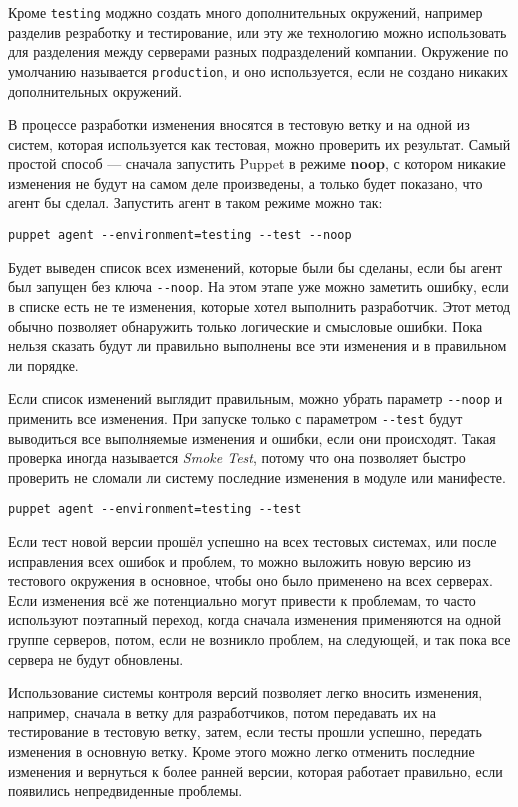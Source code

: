 Кроме \texttt{testing} моджно создать много дополнительных окружений, например разделив резработку и тестирование, или эту же технологию можно использовать для разделения между серверами разных подразделений компании. Окружение по умолчанию называется \texttt{production}, и оно используется, если не создано никаких дополнительных окружений.

В процессе разработки изменения вносятся в тестовую ветку и на одной из систем, которая используется как тестовая, можно проверить их результат. Самый простой способ --- сначала запустить Puppet в режиме \textbf{noop}, с котором никакие изменения не будут на самом деле произведены, а только будет показано, что агент бы сделал. Запустить агент в таком режиме можно так:

\begin{verbatim}
puppet agent --environment=testing --test --noop
\end{verbatim}

Будет выведен список всех изменений, которые были бы сделаны, если бы агент был запущен без ключа \texttt{-{}-noop}. На этом этапе уже можно заметить ошибку, если в списке есть не те изменения, которые хотел выполнить разработчик. Этот метод обычно позволяет обнаружить только логические и смысловые ошибки. Пока нельзя сказать будут ли правильно выполнены все эти изменения и в правильном ли порядке.

Если список изменений выглядит правильным, можно убрать параметр \texttt{-{}-noop} и применить все изменения. При запуске только с параметром \texttt{-{}-test} будут выводиться все выполняемые изменения и ошибки, если они происходят. Такая проверка иногда называется \textit{Smoke Test}, потому что она позволяет быстро проверить не сломали ли систему последние изменения в модуле или манифесте.

\begin{verbatim}
puppet agent --environment=testing --test
\end{verbatim}

Если тест новой версии прошёл успешно на всех тестовых системах, или после исправления всех ошибок и проблем, то можно выложить новую версию из тестового окружения в основное, чтобы оно было применено на всех серверах. Если изменения всё же потенциально могут привести к проблемам, то часто используют поэтапный переход, когда сначала изменения применяются на одной группе серверов, потом, если не возникло проблем, на следующей, и так пока все сервера не будут обновлены.

Использование системы контроля версий позволяет легко вносить изменения, например, сначала в ветку для разработчиков, потом передавать их на тестирование в тестовую ветку, затем, если тесты прошли успешно, передать изменения в основную ветку. Кроме этого можно легко отменить последние изменения и вернуться к более ранней версии, которая работает правильно, если появились непредвиденные проблемы.

